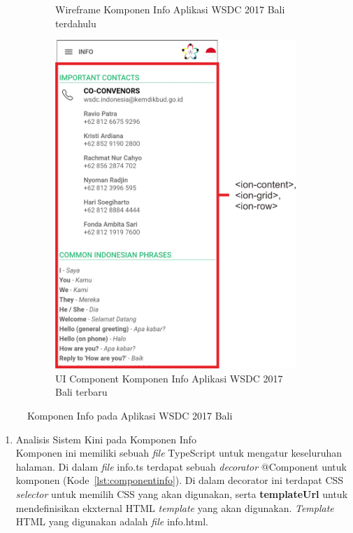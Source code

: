 \begin{enumerate}
\begin{figure}[H]
\begin{subfigure}[b]{0.43\textwidth}
         	\caption{Wireframe Komponen Info Aplikasi WSDC 2017 Bali terdahulu}
         	\label{fig:InfoPageWireframe}
     	\end{subfigure}
     	\hspace*{0.5in}
     	\begin{subfigure}[b]{0.43\textwidth}
         	\centering
         	\includegraphics[scale=0.4]{Gambar/InfoPageKini.png}
         	\caption{UI Component Komponen Info Aplikasi WSDC 2017 Bali terbaru}
         	\label{fig:InfoPageKini}
     	\end{subfigure}
        \caption{Komponen Info pada Aplikasi WSDC 2017 Bali}
        \label{fig:UIComponent1}
	\end{figure}
	\begin{enumerate}
		\item Analisis Sistem Kini pada Komponen Info \\
		Komponen ini memiliki sebuah \textit{file} TypeScript untuk mengatur keseluruhan halaman. Di dalam \textit{file} info.ts terdapat sebuah \textit{decorator} @Component untuk komponen (Kode~\ref{lst:componentinfo}). Di dalam decorator ini terdapat CSS \textit{selector} untuk memilih CSS yang akan digunakan, serta \textbf{templateUrl} untuk mendefinisikan ekxternal HTML \textit{template} yang akan digunakan. \textit{Template} HTML yang digunakan adalah \textit{file} info.html. 
	

\end{enumerate}
\end{enumerate}
